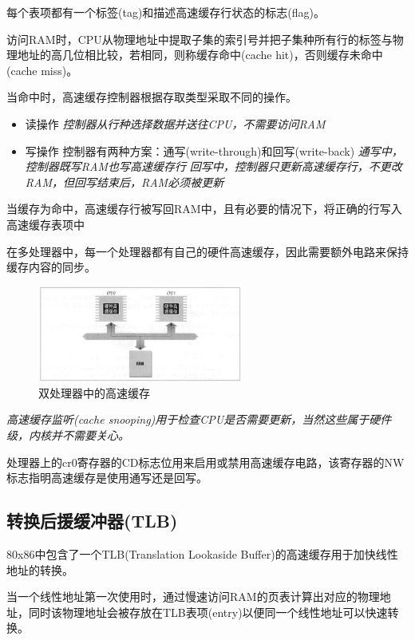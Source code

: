     每个表项都有一个标签(tag)和描述高速缓存行状态的标志(flag)。

    访问RAM时，CPU从物理地址中提取子集的索引号并把子集种所有行的标签与物理地址的高几位相比较，若相同，则称缓存命中(cache hit)，否则缓存未命中(cache miss)。

    当命中时，高速缓存控制器根据存取类型采取不同的操作。

\begin{itemize}
    \item 读操作
    \subitem \emph{控制器从行种选择数据并送往CPU，不需要访问RAM}
    \item 写操作
    \subitem 控制器有两种方案：通写(write-through)和回写(write-back)
    \subitem \emph{通写中，控制器既写RAM也写高速缓存行}
    \subitem \emph{回写中，控制器只更新高速缓存行，不更改RAM，但回写结束后，RAM必须被更新}
\end{itemize}

    当缓存为命中，高速缓存行被写回RAM中，且有必要的情况下，将正确的行写入高速缓存表项中

    在多处理器中，每一个处理器都有自己的硬件高速缓存，因此需要额外电路来保持缓存内容的同步。

\begin{figure}[!htbp]
    \centering
    \includegraphics[width=0.6\textwidth]{image/chapter02/双处理器中的高速缓存.png}
    \caption{双处理器中的高速缓存}
\end{figure}

    \emph{高速缓存监听(cache snooping)用于检查CPU是否需要更新，当然这些属于硬件级，内核并不需要关心。}

    处理器上的cr0寄存器的CD标志位用来启用或禁用高速缓存电路，该寄存器的NW标志指明高速缓存是使用通写还是回写。

\subsection{转换后援缓冲器(TLB)}

    80x86中包含了一个TLB(Translation Lookaside Buffer)的高速缓存用于加快线性地址的转换。

    当一个线性地址第一次使用时，通过慢速访问RAM的页表计算出对应的物理地址，同时该物理地址会被存放在TLB表项(entry)以便同一个线性地址可以快速转换。

